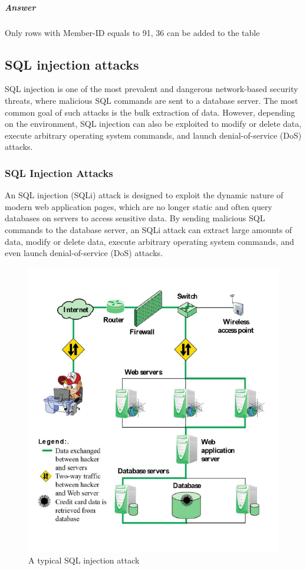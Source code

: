\documentclass{article}
\begin{document}
                        \subparagraph{Answer}
                            Only rows with Member-ID equals to 91, 36 can be added to the table
            \subsection{SQL injection attacks}
            SQL injection is one of the most prevalent and dangerous network-based security threats, where malicious SQL commands are sent to a database server. The most common goal of such attacks is the bulk extraction of data. However, depending on the environment, SQL injection can also be exploited to modify or delete data, execute arbitrary operating system commands, and launch denial-of-service (DoS) attacks.

                    \subsubsection{SQL Injection Attacks}
                    An SQL injection (SQLi) attack is designed to exploit the dynamic nature of modern web application pages, which are no longer static and often query databases on servers to access sensitive data. By sending malicious SQL commands to the database server, an SQLi attack can extract large amounts of data, modify or delete data, execute arbitrary operating system commands, and even launch denial-of-service (DoS) attacks.

                    \begin{figure}[h]
                        \centering
                        \includegraphics[scale=0.5]{../immagini/Injection_attack.png}
                        \caption{A typical SQL
                        injection
                        attack}
                    \end{figure}    
\end{document}

